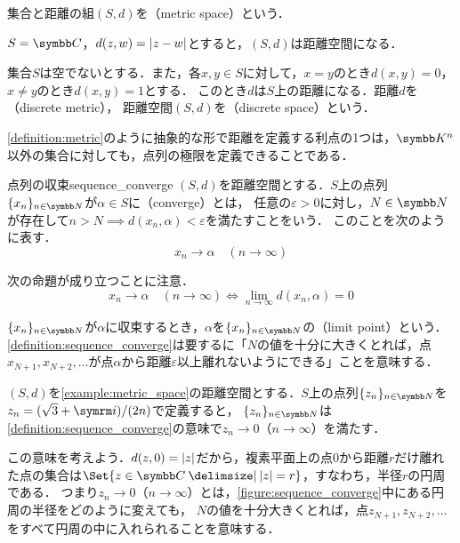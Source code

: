 \documentclass[../../main]{subfiles}
\begin{document}
集合と距離の組\((S,d)\)を（metric space）という．

\begin{example}
  \label{example:metric_space}
  \(S=\numset{C}\)，\(d(z,w)=\lvert z-w\rvert\)とすると，\((S,d)\)は距離空間になる．
\end{example}

\begin{example}[離散距離]
  \label{example:discrete_metric}
  集合\(S\)は空でないとする．また，各\(x,y\in S\)に対して，\(x=y\)のとき\(d(x,y)=0\)，\(x\neq y\)のとき\(d(x,y)=1\)とする．
  このとき\(d\)は\(S\)上の距離になる．距離\(d\)を（discrete metric），
  距離空間\((S,d)\)を（discrete space）という．
\end{example}

\cref{definition:metric}のように抽象的な形で距離を定義する利点の1つは，\(\numset{K}^n\)以外の集合に対しても，点列の極限を定義できることである．

\begin{definition}{点列の収束}{sequence_converge}
  \((S,d)\)を距離空間とする．\(S\)上の点列\(\seq{x_n}_{n\in\numset{N}}\)が\(\alpha\in S\)に（converge）とは，
  任意の\(\varepsilon>0\)に対し，\(N\in\numset{N}\)が存在して\(n>N\implies d(x_n,\alpha)<\varepsilon\)を満たすことをいう．
  このことを次のように表す．
  \[
    x_n\to\alpha\quad(n\to\infty)
  \]
\end{definition}

\begin{note}
  次の命題が成り立つことに注意．
  \[
    x_n \to \alpha\quad(n\to\infty)
    \iff\lim_{n\to\infty}d(x_n,\alpha) = 0
  \]
\end{note}

\(\seq{x_n}_{n\in\numset{N}}\)が\(\alpha\)に収束するとき，\(\alpha\)を\(\seq{x_n}_{n\in\numset{N}}\)の（limit point）という．
\cref{definition:sequence_converge}は要するに「\(N\)の値を十分に大きくとれば，点\(x_{N+1},x_{N+2},\dotsc\)が点\(\alpha\)から距離\(\varepsilon\)以上離れないようにできる」ことを意味する．

\begin{example}
  \label{example:complex_planes_convergence}
  \((S,d)\)を\cref{example:metric_space}の距離空間とする．\(S\)上の点列\(\seq{z_n}_{n\in\numset{N}}\)を\(z_n=(\sqrt{3}+\iuni)/(2n)\)で定義すると，
  \(\seq{z_n}_{n\in\numset{N}}\)は\cref{definition:sequence_converge}の意味で\(z_n\to 0\)（\(n\to\infty\)）を満たす．

  この意味を考えよう．\(d(z,0)=\lvert z\rvert\)だから，複素平面上の点\(0\)から距離\(r\)だけ離れた点の集合は\(\Set{z\in\numset{C}\given\abs{z}=r}\)，すなわち，半径\(r\)の円周である．
  つまり\(z_n\to 0\)（\(n\to\infty\)）とは，\cref{figure:sequence_converge}中にある円周の半径をどのように変えても，
  \(N\)の値を十分大きくとれば，点\(z_{N+1},z_{N+2},\dotsc\)をすべて円周の中に入れられることを意味する．
\end{example}
\end{document}
